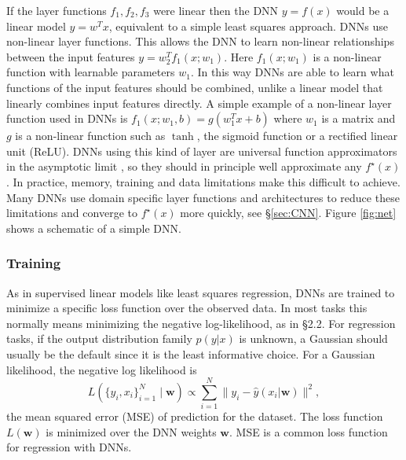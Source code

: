 If the layer functions $f_1, f_2, f_3$ were linear then the DNN $y = f(x)$ would be a linear model $y = w^Tx$, equivalent to a simple least squares approach. DNNs use non-linear layer functions. This allows the DNN to learn non-linear relationships between the input features $y = w_2^Tf_1(x; w_1)$. Here $f_1(x;w_1)$ is a non-linear function with learnable parameters $w_1$.
In this way DNNs are able to learn what functions of the input features should be combined, unlike a linear model that linearly combines input features directly.
A simple example of a non-linear layer function used in DNNs is $f_1(x;w_1,b) = g(w_1^Tx + b)$ where $w_1$ is a matrix and $g$ is a non-linear function such as $\tanh$, the sigmoid function or a rectified linear unit (ReLU). DNNs using this kind of layer are universal function approximators in the asymptotic limit \citep{hornik_multilayer_1989}, so they should in principle well approximate any $f^{\star}(x)$. In practice, memory, training and data limitations make this difficult to achieve. Many DNNs use domain specific layer functions and architectures to reduce these limitations and converge to $f^{\star}(x)$ more quickly, see \S\ref{sec:CNN}. Figure \ref{fig:net} shows a schematic of a simple DNN.

\subsubsection{Training}
\label{sec:training}
As in supervised linear models like least squares regression, DNNs are trained to minimize a specific loss function over the observed data. In most tasks this normally means minimizing the negative log-likelihood, as in \S2.2. For regression tasks, if the output distribution family $p(y|x)$ is unknown, a Gaussian should usually be the default since it is the least informative choice. For a Gaussian likelihood, the negative log likelihood is 
\begin{equation}
    L(\{y_i,x_i\}_{i=1}^N\mid\mathbf{w}) \propto \sum^N_{i=1}\|y_i - \hat{y}(x_i|\mathbf{w})\|^2,
    \label{eqn:egloss}
\end{equation}
the mean squared error (MSE) of prediction for the dataset. The loss function $L(\mathbf{w})$ is minimized over the DNN weights $\mathbf{w}$. MSE is a common loss function for regression with DNNs.

